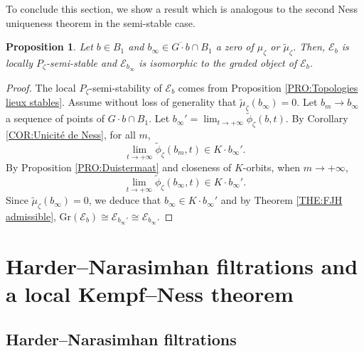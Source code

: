 \documentclass{article}
\newtheorem{proposition}[theorem]{Proposition}
\theoremstyle{remark}
\theoremstyle{definition}
\newcommand{\E}{\mathcal{E}}
\begin{document}
To conclude this section, we show a result which is analogous to the second Ness uniqueness theorem \cite[Theorem 6.5]{GRS} in the semi-stable case.

\begin{proposition}\label{PRO:Unicité dégénération polystable}
    Let $b \in B_1$ and $b_\infty \in \overline{G \cdot b} \cap B_1$ a zero of $\mu_\zeta$ or $\tilde{\mu}_\zeta$. Then, $\E_b$ is locally $P_\zeta$-semi-stable and $\E_{b_\infty}$ is isomorphic to the graded object of $\E_b$.
\end{proposition}
\begin{proof}
The local $P_\zeta$-semi-stability of $\E_b$ comes from Proposition \ref{PRO:Topologies lieux stables}. Assume without loss of generality that $\tilde{\mu}_\zeta(b_\infty) = 0$. Let $b_m \rightarrow b_\infty$ a sequence of points of $G \cdot b \cap B_1$. Let $b_\infty' = \lim_{t \rightarrow +\infty} \tilde{\phi}_\zeta(b,t)$. By Corollary \ref{COR:Unicité de Ness}, for all $m$,
$$
\lim_{t \rightarrow +\infty} \tilde{\phi}_\zeta(b_m,t) \in K \cdot b_\infty'.
$$
By Proposition \ref{PRO:Duistermaat} and closeness of $K$-orbits, when $m \rightarrow +\infty$,
$$
\lim_{t \rightarrow +\infty} \tilde{\phi}_\zeta(b_\infty,t) \in K \cdot b_\infty'.
$$
Since $\tilde{\mu}_\zeta(b_\infty) = 0$, we deduce that $b_\infty \in K \cdot b_\infty'$ and by Theorem \ref{THE:FJH admissible}, $\mathrm{Gr}(\E_b) \cong \E_{b_\infty'} \cong \E_{b_\infty}$.
\end{proof}

\section{Harder--Narasimhan filtrations and a local Kempf--Ness theorem}\label{SEC:Kempf--Ness}

\subsection{Harder--Narasimhan filtrations}
\end{document}
